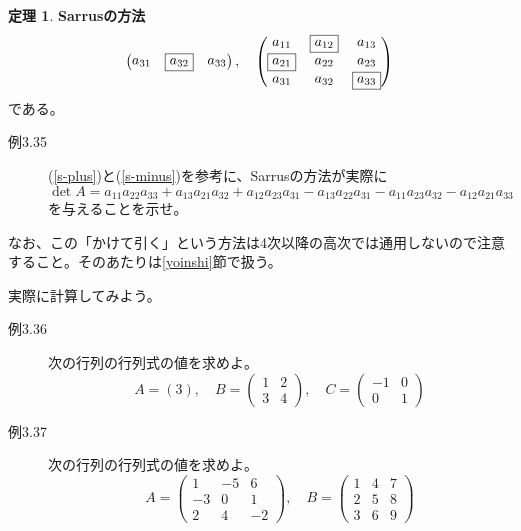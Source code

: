 \documentclass[10pt]{jsreport}
\theoremstyle{definition}%
\newtheorem{thm}{定理}[section]%
\numberwithin{equation}{section}%
\begin{document}
\begin{screen}
\begin{thm}{\bf Sarrusの方法}
\begin{equation}
\begin{pmatrix}
    a_{31} & \fbox{$a_{32}$} & a_{33}
  \end{pmatrix} , \quad \begin{pmatrix}
    a_{11} & \fbox{$a_{12}$} & a_{13} \\
    \fbox{$a_{21}$} & a_{22} & a_{23} \\
    a_{31} & a_{32} & \fbox{$a_{33}$}
  \end{pmatrix}  
\end{equation}
である。
\begin{description}
  \item[例3.35] (\ref{s-plus})と(\ref{s-minus})を参考に、Sarrusの方法が実際に
  \begin{equation}
    \det A =a_{11}a_{22}a_{33}+a_{13}a_{21}a_{32}+a_{12}a_{23}a_{31}-a_{13}a_{22}a_{31}-a_{11}a_{23}a_{32}-a_{12}a_{21}a_{33}
  \end{equation}
  を与えることを示せ。
\end{description}
なお、この「かけて引く」という方法は4次以降の高次では通用しないので注意すること。そのあたりは\ref{yoinshi}節で扱う。
\end{thm}
\end{screen}
実際に計算してみよう。
\begin{description}
  \item[例3.36] 次の行列の行列式の値を求めよ。
  \begin{equation}
    A=(3) ,\quad B= \begin{pmatrix}
      1 & 2 \\
      3 & 4 
    \end{pmatrix},\quad C=\begin{pmatrix}
      -1 & 0 \\
      0 & 1 
    \end{pmatrix}
  \end{equation}
  \item[例3.37] 次の行列の行列式の値を求めよ。
  \begin{equation}
    A= \begin{pmatrix}
      1 & -5 & 6 \\
      -3 & 0 & 1 \\
      2 & 4 & -2
    \end{pmatrix},\quad B=\begin{pmatrix}
      1 & 4 & 7 \\
      2 & 5 & 8 \\
      3 & 6 & 9
    \end{pmatrix}
  \end{equation}
\end{description}
\end{document}
